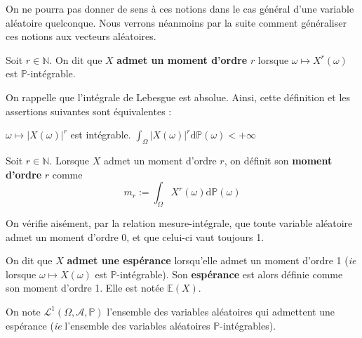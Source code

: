 \documentclass[../integ-proba.tex]{subfiles}
\begin{document}
    On ne pourra pas donner de sens à ces notions dans le cas général d'une variable aléatoire quelconque.
    Nous verrons néanmoins par la suite comment généraliser ces notions aux vecteurs aléatoires.

    \begin{defi}
        Soit $r\in\mathbb{N}$.
        On dit que $X$ \textbf{admet un moment d'ordre} $r$ lorsque $\omega \mapsto X^r(\omega)$ est $\mathbb{P}$-intégrable.
    \end{defi}

    \begin{rem}
        On rappelle que l'intégrale de Lebesgue est absolue.
        Ainsi, cette définition et les assertions suivantes sont équivalentes :
        \begin{itemize}
            \itemb $\omega \mapsto \left|X(\omega)\right|^r$ est intégrable.
            \itemb $\displaystyle \int_\Omega\left|X(\omega)\right|^r\text{d}\mathbb{P}(\omega) < +\infty$
        \end{itemize}
    \end{rem}

    \begin{defi}
        Soit $r\in\mathbb{N}$.
        Lorsque $X$ admet un moment d'ordre $r$, on définit son \textbf{moment d'ordre } $r$ comme
        \begin{displaymath}
          m_r := \int_\Omega X^r(\omega)\text{d}\mathbb{P}(\omega)
        \end{displaymath}
    \end{defi}

    \begin{rem}
        On vérifie aisément, par la relation mesure-intégrale, que toute variable aléatoire admet un moment d'ordre 0, et que celui-ci vaut toujours 1.
    \end{rem}

    \begin{defi}
        On dit que $X$ \textbf{admet une espérance} lorsqu'elle admet un moment d'ordre 1 (\textit{ie} lorsque $\omega \mapsto X\left(\omega\right)$ est $\mathbb{P}$-intégrable).
        Son \textbf{espérance} est alors définie comme son moment d'ordre 1.
        Elle est notée $\mathbb{E}(X)$.

        On note $\mathcal{L}^1\left(\Omega, \mathcal{A}, \mathbb{P}\right)$ l'ensemble des variables aléatoires qui admettent une espérance (\textit{ie} l'ensemble des variables aléatoires $\mathbb{P}$-intégrables).
    \end{defi}
\end{document}
